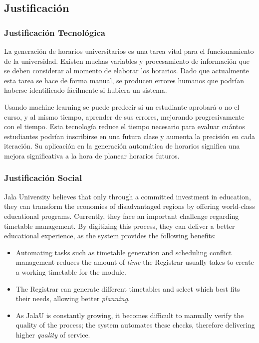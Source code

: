 \subsection{Justificación}

\subsubsection{Justificación Tecnológica}
La generación de horarios universitarios es una tarea vital para el funcionamiento de la universidad.
Existen muchas variables y procesamiento de información que se deben considerar al momento de elaborar los horarios. Dado que actualmente esta tarea se hace de forma manual, se producen errores humanos que podrían haberse identificado fácilmente si hubiera un sistema.

Usando machine learning se puede predecir si un estudiante aprobará o no el curso, y al mismo tiempo, aprender de sus errores, mejorando progresivamente con el tiempo.
Esta tecnología reduce el tiempo necesario para evaluar cuántos estudiantes podrían inscribirse en una futura clase y aumenta la precisión en cada iteración. Su aplicación en la generación automática de horarios significa una mejora significativa a la hora de planear horarios futuros.

\subsubsection{Justificación Social}
Jala University believes that only through a committed investment in education, they can transform the economies of disadvantaged regions by offering world-class educational programs.
Currently, they face an important challenge regarding timetable management. By digitizing this process, they can deliver a better educational experience, as the system provides the following benefits:

\begin{itemize}
    \item Automating tasks such as timetable generation and scheduling conflict management reduces the amount of \textit{time} the Registrar usually takes to create a working timetable for the module.
    \item The Registrar can generate different timetables and select which best fits their needs, allowing better \textit{planning}.
    \item As JalaU is constantly growing, it becomes difficult to manually verify the quality of the process; the system automates these checks, therefore delivering higher \textit{quality} of service.
\end{itemize}

